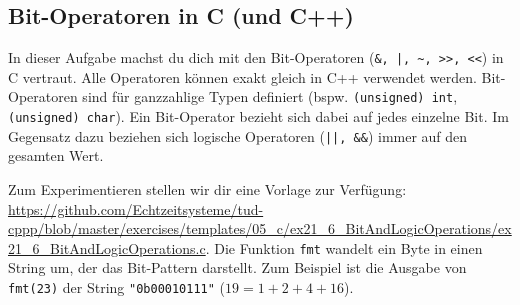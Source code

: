 \subsection{Bit-Operatoren in C (und C++)}

In dieser Aufgabe machst du dich mit den Bit-Operatoren (\lstinline{&, |, ~, >>, <<}) in C vertraut.
Alle Operatoren können exakt gleich in C++ verwendet werden.
Bit-Operatoren sind für ganzzahlige Typen definiert (bspw. \lstinline|(unsigned) int|, \lstinline|(unsigned) char|).
Ein Bit-Operator bezieht sich dabei auf jedes einzelne Bit.
Im Gegensatz dazu beziehen sich logische Operatoren (\lstinline{||, &&}) immer auf den gesamten Wert.

Zum Experimentieren stellen wir dir eine Vorlage zur Verfügung: \url{https://github.com/Echtzeitsysteme/tud-cppp/blob/master/exercises/templates/05_c/ex21_6_BitAndLogicOperations/ex21_6_BitAndLogicOperations.c}.
Die Funktion \lstinline|fmt| wandelt ein Byte in einen String um, der das Bit-Pattern darstellt.
Zum Beispiel ist die Ausgabe von \lstinline|fmt(23)| der String \lstinline|"0b00010111"| ($19 = 1 + 2 + 4 + 16$).
